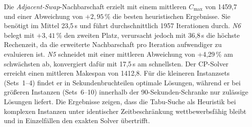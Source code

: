 \begin{table}[H]
    \centering
    \caption{Vergleich der Tabu-Suche-Nachbarschaften mit dem CP-Solver \"uber alle 30 Classroom Instanzen (Zeitlimit: 90\,s).}
    \label{tab:solver_comparison_all}
\end{table}

Die \emph{Adjacent-Swap}-Nachbarschaft erzielt mit einem mittleren $C_{\max}$ von 1459,7 und einer Abweichung von $+2{,}95\,\%$ die besten heuristischen Ergebnisse.
Sie benötigt im Mittel 23,5\,s und führt durchschnittlich 1957 Iterationen durch.
\emph{N6} belegt mit $+3{,}41\,\%$ den zweiten Platz, verursacht jedoch mit 36,8\,s die höchste Rechenzeit, da die erweiterte Nachbarschaft pro Iteration aufwendiger zu evaluieren ist.
\emph{N5} schneidet mit einer mittleren Abweichung von +4,29\,\% am schwächsten ab, konvergiert dafür mit 17,5\,s am schnellsten.
Der CP-Solver erreicht einen mittleren Makespan von 1412,8.
Für die kleineren Instanzsets (Sets~1--4) findet er in Sekundenbruchteilen optimale Lösungen, während er bei größeren Instanzen (Sets~6--10) innerhalb der 90-Sekunden-Schranke nur zulässige Lösungen liefert.
Die Ergebnisse zeigen, dass die Tabu-Suche als Heuristik bei komplexen Instanzen unter identischer Zeitbeschränkung wettbewerbsfähig bleibt und in Einzelfällen den exakten Solver übertrifft.